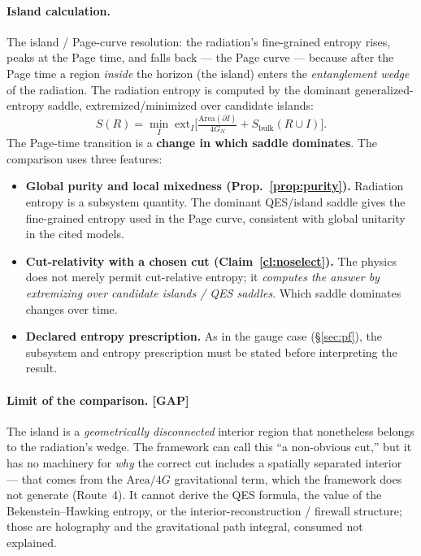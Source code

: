 \documentclass[11pt]{article}
\newcommand{\gap}{\textcolor{red!75!black}{\textsf{\small[GAP]}}}
\theoremstyle{definition}
\theoremstyle{remark}
\begin{document}
\paragraph{Island calculation.}
The island / Page-curve resolution: the radiation's fine-grained entropy rises, peaks at the Page time, and falls back --- the Page curve --- because after the Page time a region \emph{inside} the horizon (the island) enters the \emph{entanglement wedge} of the radiation. The radiation entropy is computed by the dominant generalized-entropy saddle, extremized/minimized over candidate islands:
\[
  S(R) = \min_I\;\mathrm{ext}_I\Big[\tfrac{\mathrm{Area}(\partial I)}{4G_N} + S_{\text{bulk}}(R\cup I)\Big].
\]
The Page-time transition is a \textbf{change in which saddle dominates}. The comparison uses three features:
\begin{itemize}[leftmargin=1.4em, itemsep=2pt, topsep=2pt]
  \item \textbf{Global purity and local mixedness (Prop.~\ref{prop:purity}).} Radiation entropy is a subsystem quantity. The dominant QES/island saddle gives the fine-grained entropy used in the Page curve, consistent with global unitarity in the cited models.
  \item \textbf{Cut-relativity with a chosen cut (Claim~\ref{cl:noselect}).} The physics does not merely permit cut-relative entropy; it \emph{computes the answer by extremizing over candidate islands / QES saddles}. Which saddle dominates changes over time.
  \item \textbf{Declared entropy prescription.} As in the gauge case (\S\ref{sec:pf}), the subsystem and entropy prescription must be stated before interpreting the result.
\end{itemize}

\paragraph{Limit of the comparison. \gap}
The island is a \emph{geometrically disconnected} interior region that nonetheless belongs to the radiation's wedge. The framework can call this ``a non-obvious cut,'' but it has no machinery for \emph{why} the correct cut includes a spatially separated interior --- that comes from the $\mathrm{Area}/4G$ gravitational term, which the framework does not generate (Route~4). It cannot derive the QES formula, the value of the Bekenstein--Hawking entropy, or the interior-reconstruction / firewall structure; those are holography and the gravitational path integral, consumed not explained.
\end{document}
